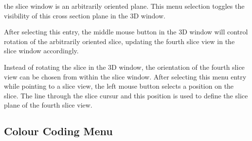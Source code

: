 \begin{description}
       the slice window is an arbitrarily oriented plane.  This menu
       selection toggles the visibility of this cross section plane in
       the 3D window.
\item[\menutwo{Slice}{Rotate Slice}]  After selecting this entry,
       the middle mouse button in the 3D window will control rotation
       of the arbitrarily oriented slice, updating the fourth slice
       view in the slice window accordingly.
\item[\menutwo{Slice}{Pick Slice Angle}]  Instead of rotating the
       slice in the 3D window, the orientation of the fourth slice
       view can be chosen from within the slice window.  After
       selecting this menu entry while pointing to a slice view, the left
       mouse button selects a position on the slice.  The line through
       the slice cursur and this position is used to define the slice
       plane of the fourth slice view.
\end{description}

\subsection{Colour Coding Menu}

